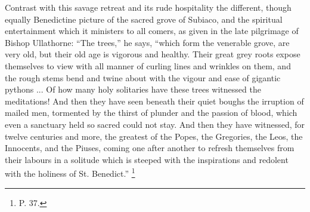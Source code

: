 Contrast with this savage retreat and its rude hospitality the
different, though equally Benedictine picture of the sacred
grove of Subiaco, and the spiritual entertainment which it ministers
to all comers, as given in the late pilgrimage of Bishop Ullathorne:
``The trees,'' he says, ``which form the venerable grove,
are very old, but their old age is vigorous and healthy. Their great
grey roots expose themselves to view with all manner of curling lines
and wrinkles on them, and the rough stems bend and twine about with
the vigour and ease of gigantic pythons ... Of how many holy
solitaries have these trees witnessed the meditations! And then they
have seen beneath their quiet boughs the irruption of mailed men,
tormented by the thirst of plunder and the passion of blood, which
even a sanctuary held so sacred could not stay. And then they have
witnessed, for twelve centuries and more, the greatest of the Popes,
the Gregories, the Leos, the Innocents, and the Piuses, coming one
after another to refresh themselves from their labours in a solitude
which is steeped with the inspirations and redolent with the holiness
of St. Benedict.'' \footnote{P. 37.}

